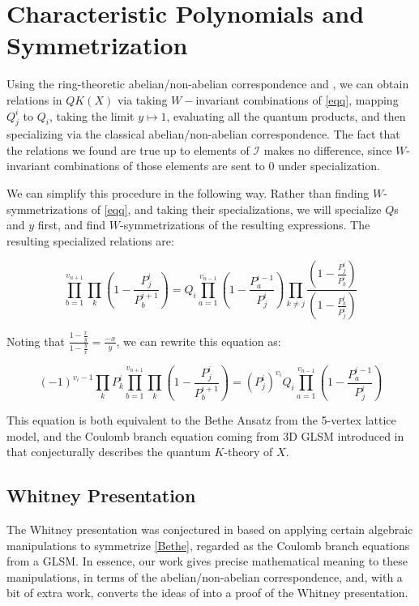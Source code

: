 \documentclass[11pt,letterpaper]{amsart}
\begin{document}
\section{Characteristic Polynomials and Symmetrization}

Using the ring-theoretic abelian/non-abelian correspondence and \cite[Thm 6.15]{me}, we can obtain relations in $QK(X)$ via taking $W-$invariant combinations of \eqref{eqq}, mapping $Q^{i}_j$ to $Q_i$, taking the limit $y\mapsto 1$, evaluating all the quantum products, and then specializing via the classical abelian/non-abelian correspondence. The fact that the relations we found are true up to elements of $\mathscr{I}$ makes no difference, since $W$-invariant combinations of those elements are sent to $0$ under specialization.


We can simplify this procedure in the following way. Rather than finding $W$-symmetrizations of \eqref{eqq}, and taking their specializations, we will specialize $Q$s and $y$ first, and find $W$-symmetrizations of the resulting expressions. The resulting specialized relations are:



\begin{equation}
\prod_{b=1}^{v_{n+1}}\prod_k(1-\frac{P^i_j}{P^{i+1}_b})=Q_{i}\prod_{a=1}^{v_{n-1}}(1-\frac{P^{i-1}_a}{P^{i}_j})\prod_{k\neq j}\frac{(1- \frac{P_j^i}{P_k^{i}})}{ (1- \frac{P^i_k}{P^i_j})}
\end{equation}

Noting that $\frac{1-\frac{x}{y}}{1-\frac{y}{x}}=\frac{-x}{y}$, we can rewrite this equation as:


\begin{equation}
\label{Bethe}
(-1)^{v_i-1}\prod_k P^i_k\prod_{b=1}^{v_{n+1}}\prod_k(1-\frac{P^i_j}{P^{i+1}_b})=(P^i_j)^{v_i}Q_{i}\prod_{a=1}^{v_{n-1}}(1-\frac{P^{i-1}_a}{P^{i}_j})
\end{equation}


This equation is both equivalent to the Bethe Ansatz from the 5-vertex lattice model, and the Coulomb branch equation coming from 3D GLSM introduced in \cite{conj} that conjecturally describes the quantum $K$-theory of $X$. 
\subsection{Whitney Presentation}
The Whitney presentation was conjectured in \cite{conjpf} based on applying certain algebraic manipulations to symmetrize \eqref{Bethe}, regarded as the Coulomb branch equations from a GLSM. In essence, our work gives precise mathematical meaning to these manipulations, in terms of the abelian/non-abelian correspondence, and, with a bit of extra work, converts the ideas of \cite{conjpf} into a proof of the Whitney presentation. 
\end{document}
